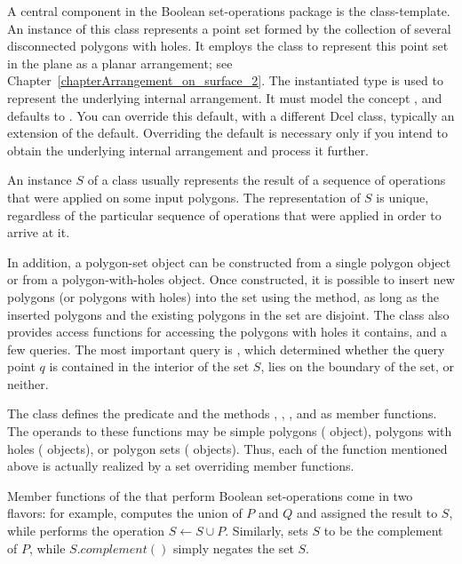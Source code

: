 A central component in the Boolean set-operations package is the
 class-template. An instance of 
this class represents a point set formed by the collection of several 
disconnected polygons with holes. It employs the  class 
to represent this point set in the plane as a planar arrangement; see 
Chapter~\ref{chapterArrangement_on_surface_2}. The instantiated 
type is used to represent the underlying internal arrangement. It must model
the concept , and defaults to .
You can override this default, with a different {\sc Dcel} class, typically
an extension of the default. Overriding the default is necessary only if 
you intend to obtain the underlying internal arrangement and process it further.

An instance $S$ of a  class usually represents
the result of a sequence of operations that were applied on some input
polygons. The representation of $S$ is unique, regardless of the particular
sequence of operations that were applied in order to arrive at it.

In addition, a polygon-set object can be constructed from a single
polygon object or from a polygon-with-holes object. Once constructed,
it is possible to insert new polygons (or polygons with holes)
into the set using the  method, as long as the inserted
polygons and the existing polygons in the set are disjoint. 
The  class also provides access functions for
accessing the polygons with holes it contains, and a few queries. The
most important query is , which determined
whether the query point $q$ is contained in the interior of the set
$S$, lies on the boundary of the set, or neither.

The  class defines the predicate
 and the methods , ,
,  and  as member
functions. The operands to these functions may be simple polygons 
( object), polygons with holes
( objects), or polygon sets
( objects). Thus, each of the function
mentioned above is actually realized by a set overriding member
functions.

Member functions of the  that perform
Boolean set-operations come in two flavors: for example, 
computes the union of $P$ and $Q$ and assigned the result to $S$, while
 performs the operation $S \longleftarrow S \cup P$.
Similarly,  sets $S$ to be the complement of $P$,
while $S.complement()$ simply negates the set $S$.


